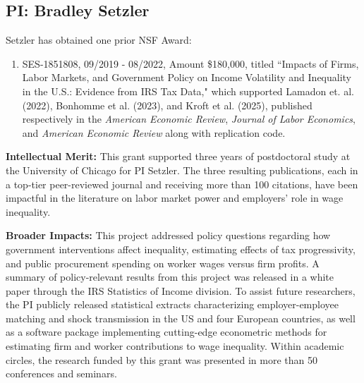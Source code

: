 \documentclass[11pt]{article}
\begin{document}
\subsection{PI: Bradley Setzler}

Setzler has obtained one prior NSF Award:
\begin{enumerate}  
\item SES-1851808, 09/2019 - 08/2022, Amount \$180,000, titled ``Impacts of Firms, Labor Markets, and Government Policy on Income Volatility and Inequality in the U.S.: Evidence from IRS Tax Data," which supported Lamadon et. al. (2022), Bonhomme et al. (2023), and Kroft et al. (2025), published respectively in the \emph{American Economic Review}, \emph{Journal of Labor Economics}, and \emph{American Economic Review} along with replication code.
\end{enumerate}

\noindent\textbf{Intellectual Merit:} This grant supported three years of postdoctoral study at the University of Chicago for PI Setzler. The three resulting publications, each in a top-tier peer-reviewed journal and receiving more than 100 citations, have been impactful in the literature on labor market power and employers' role in wage inequality. 

\noindent\textbf{Broader Impacts:} This project addressed policy questions regarding how government interventions affect inequality, estimating effects of tax progressivity, and public procurement spending on worker wages versus firm profits. A summary of policy-relevant results from this project was released in a white paper through the IRS Statistics of Income division.  To assist future researchers, the PI publicly released statistical extracts characterizing employer-employee matching and shock transmission in the US and four European countries, as well as a software package implementing cutting-edge econometric methods for estimating firm and worker contributions to wage inequality. Within academic circles, the research funded by this grant was presented in more than 50 conferences and seminars.
\end{document}

